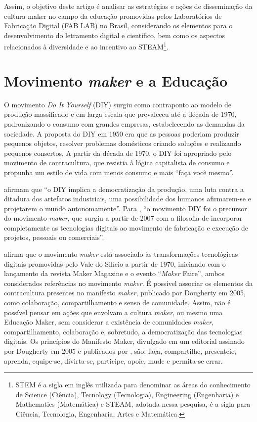 \documentclass[portuguese]{textolivre}
\begin{document}
Assim, o objetivo deste artigo é analisar as estratégias e ações de disseminação da cultura maker no campo da educação promovidas pelos Laboratórios de Fabricação Digital (FAB LAB) no Brasil, considerando os elementos para o desenvolvimento do letramento digital e científico, bem como os aspectos relacionados à diversidade e ao incentivo ao STEAM\footnote{STEM é a sigla em inglês utilizada para denominar as áreas do conhecimento de Science (Ciência), Tecnology (Tecnologia), Engineering (Engenharia) e Mathematics (Matemática) e STEAM, adotada nessa pesquisa, é a sigla para Ciência, Tecnologia, Engenharia, Artes e Matemática.}.

\section{Movimento \textit{maker} e a Educação}\label{sec-normas}
O movimento \textit{Do It Yourself} (DIY) surgiu como contraponto ao modelo de produção massificado e em larga escala que prevaleceu até a década de 1970, padronizando o consumo com grandes empresas, estabelecendo as demandas da sociedade. A proposta do DIY em 1950 era que as pessoas poderiam produzir pequenos objetos, resolver problemas domésticos criando soluções e realizando pequenos consertos. A partir da década de 1970, o DIY foi apropriado pelo movimento de contracultura, que resistia à lógica capitalista de consumo e propunha um estilo de vida com menos consumo e mais ``faça você mesmo''.

\textcite[p.~1]{cabeza_o_2014} afirmam que ``o DIY implica a democratização da produção, uma luta contra a ditadura dos artefatos industriais, uma possibilidade dos humanos afirmarem-se e projetarem o mundo autonomamente''. Para \textcite[p.~26]{carvalho_cultura_2018}, ``o movimento DIY foi o precursor do movimento \textit{maker}, que surgiu a partir de 2007 com a filosofia de incorporar completamente as tecnologias digitais ao movimento de fabricação e execução de projetos, pessoais ou comerciais''.

\textcite{anderson_makers:_2012} afirma que o movimento \textit{maker} está associado às transformações tecnológicas digitais promovidas pelo Vale do Silício a partir de 1970, iniciando com o lançamento da revista Maker Magazine e o evento ``\textit{Maker} Faire'', ambos considerados referências no movimento \textit{maker}. É possível associar os elementos da contracultura presentes no manifesto \textit{maker}, publicado por Dougherty em 2005, como colaboração, compartilhamento e senso de comunidade. Assim, não é possível pensar em ações que envolvam a cultura \textit{maker}, ou mesmo uma Educação Maker, sem considerar a existência de comunidades \textit{maker}, compartilhamento, colaboração e, sobretudo, a democratização das tecnologias digitais. Os princípios do Manifesto Maker, divulgado em um editorial assinado por Dougherty em 2005 e publicados por \textcite{hatch_maker_2013}, são: faça, compartilhe, presenteie, aprenda, equipe-se, divirta-se, participe, apoie, mude e permita-se errar.
\end{document}
